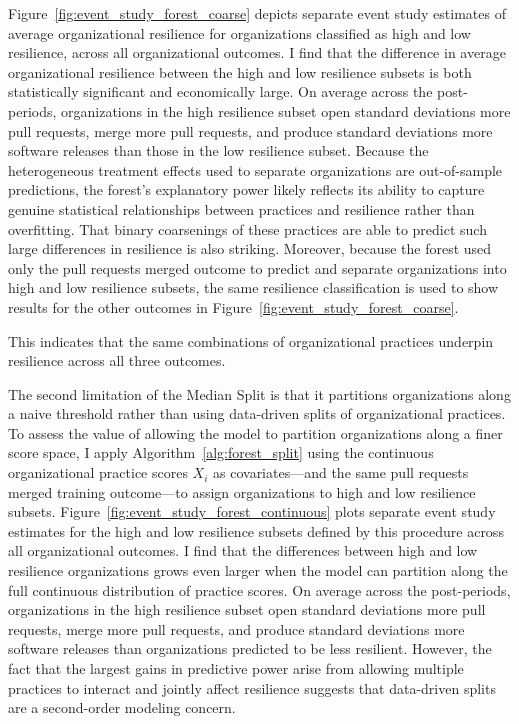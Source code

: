 \documentclass[12pt,notitlepage]{article}
\begin{document}

Figure~\ref{fig:event_study_forest_coarse} depicts separate event study estimates of average organizational resilience for organizations classified as high and low resilience, across all organizational outcomes.
I find that the difference in average organizational resilience between the high and low resilience subsets is both statistically significant and economically large. 
On average across the \NumPostPeriod{} post-periods, organizations in the high resilience subset open \ForestCoarsePRsOpenedDiff{} standard deviations more pull requests, merge \ForestCoarsePRsMergedDiff{} more pull requests, and produce \ForestCoarseReleasesDiff{} standard deviations more software releases than those in the low resilience subset.
Because the heterogeneous treatment effects used to separate organizations are out-of-sample predictions, the forest's explanatory power likely reflects its ability to capture genuine statistical relationships between practices and resilience rather than overfitting. 
That binary coarsenings of these practices are able to predict such large differences in resilience is also striking. 
Moreover, because the forest used only the pull requests merged outcome to predict and separate organizations into high and low resilience subsets, the same resilience classification is used to show results for the other outcomes in Figure~\ref{fig:event_study_forest_coarse}.

This indicates that the same combinations of organizational practices underpin resilience across all three outcomes.


The second limitation of the Median Split is that it partitions organizations along a naive threshold rather than using data-driven splits of organizational practices. 
To assess the value of allowing the model to partition organizations along a finer score space, I apply Algorithm~\ref{alg:forest_split} using the continuous organizational practice scores $X_i$ as covariates---and the same pull requests merged training outcome---to assign organizations to high and low resilience subsets. 
Figure~\ref{fig:event_study_forest_continuous} plots separate event study estimates for the high and low resilience subsets defined by this procedure across all organizational outcomes. 
I find that the differences between high and low resilience organizations grows even larger when the model can partition along the full continuous distribution of practice scores. 
On average across the \NumPostPeriod{} post-periods, organizations in the high resilience subset open \ForestContPRsOpenedDiff{} standard deviations more pull requests, merge \ForestContPRsMergedDiff{} more pull requests, and produce \ForestContReleasesDiff{} standard deviations more software releases than organizations predicted to be less resilient.
However, the fact that the largest gains in predictive power arise from allowing multiple practices to interact and jointly affect resilience suggests that data-driven splits are a second-order modeling concern.
\end{document}
